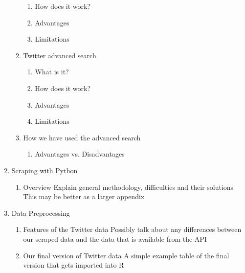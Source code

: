 \documentclass{article}
\begin{document}
\begin{enumerate}
\begin{enumerate}
\begin{enumerate}
\item How does it work?
\label{sec-2-2-3-2}

\item Advantages
\label{sec-2-2-3-3}

\item Limitations
\label{sec-2-2-3-4}
\end{enumerate}

\item Twitter advanced search
\label{sec-2-2-4}

\begin{enumerate}
\item What is it?
\label{sec-2-2-4-1}

\item How does it work?
\label{sec-2-2-4-2}

\item Advantages
\label{sec-2-2-4-3}

\item Limitations
\label{sec-2-2-4-4}
\end{enumerate}

\item How we have used the advanced search
\label{sec-2-2-5}

\begin{enumerate}
\item Advantages vs. Disadvantages
\label{sec-2-2-5-1}
\end{enumerate}
\end{enumerate}


\item\relax [Optional] Scraping with Python
\label{sec-2-3}

\begin{enumerate}
\item Overview
\label{sec-2-3-1}
Explain general methodology, difficulties and their solutions
This may be better as a larger appendix
\end{enumerate}

\item{} Data Preprocessing
\label{sec-2-4}

\begin{enumerate}
\item Features of the Twitter data
\label{sec-2-4-1}
Possibly talk about any differences between our scraped data and the data that is available from the API
\item Our final version of Twitter data
\label{sec-2-4-2}
A simple example table of the final version that gets imported into R
\end{enumerate}


\end{enumerate}
\end{document}
